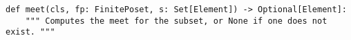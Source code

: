\begin{verbatim}
def meet(cls, fp: FinitePoset, s: Set[Element]) -> Optional[Element]:
    """ Computes the meet for the subset, or None if one does not exist. """
\end{verbatim}